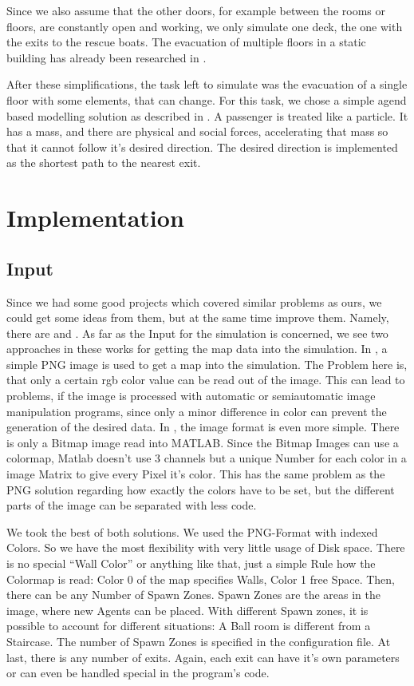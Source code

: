\documentclass[11pt]{article}
\begin{document}
Since we also assume that the other doors, for example between the rooms or floors, are constantly open and working, we only simulate one deck, the one with the exits to the rescue boats.
The evacuation of multiple floors in a static building has already been researched in \cite{multilevel}. 

After these simplifications, the task left to simulate was the evacuation of a single floor with some elements, that can change.
For this task, we chose a simple agend based modelling solution as described in \cite{helbing}.
A passenger is treated like a particle. It has a mass, and there are physical and social forces, accelerating that mass so that it cannot follow it's desired direction.
The desired direction is implemented as the shortest path to the nearest exit.

\section{Implementation}

\subsection{Input}
Since we had some good projects which covered similar problems as ours, we could get some ideas from them, but at the same time improve them.
Namely, there are \cite{multilevel} and \cite{airplane}. As far as the Input for the simulation is concerned, we see two approaches in these works for getting the map data into the simulation. In \cite{multilevel}, a simple PNG image is used to get a map into the simulation. The Problem here is, that only a certain rgb color value can be read out of the image.
This can lead to problems, if the image is processed with automatic or semiautomatic image manipulation programs, since only a minor difference in color can prevent the generation of the desired data.
In \cite{airplane}, the image format is even more simple. There is only a Bitmap image read into MATLAB. Since the Bitmap Images can use a colormap, Matlab doesn't use 3 channels but a unique Number for each color in a image Matrix to give every Pixel it's color.
This has the same problem as the PNG solution regarding how exactly the colors have to be set, but
the different parts of the image can be separated with less code.

We took the best of both solutions. We used the PNG-Format with indexed Colors.
So we have the most flexibility with very little usage of Disk space.
There is no special ``Wall Color'' or anything like that, just a simple Rule how the Colormap is read:
Color 0 of the map specifies Walls, Color 1 free Space. Then, there can be any Number of Spawn Zones.
Spawn Zones are the areas in the image, where new Agents can be placed. With different Spawn zones, it is possible to account for different situations: A Ball room is different from a Staircase. The number of Spawn Zones is specified in the configuration file. At last, there is any number of exits. Again, each exit can have it's own parameters or can even be handled special in the program's code. 
\end{document}
